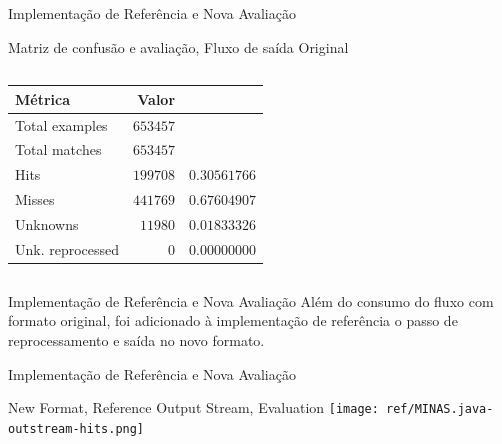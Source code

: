 \documentclass[aspectratio=43,10pt]{beamer}
\begin{document}
\begin{frame}[fragile]{Implementação de Referência e Nova Avaliação}
\begin{alertblock}{Matriz de confusão e avaliação, Fluxo de saída Original}
\begin{columns}[T,onlytextwidth]
      \footnotesize{
      \begin{tabular}
        { l                     | r                 r             }
        \textbf{Métrica}        & \textbf{Valor}  &               \\ \hline
        \hline Total examples   & $653457$        &               \\
        \hline Total matches    & $653457$        &               \\
        \hline Hits             & $199708$        & $0.30561766$  \\
        \hline Misses           & $441769$        & $0.67604907$ \\
        \hline Unknowns         & $11980$         & $0.01833326$ \\
        \hline Unk. reprocessed & $0$             & $0.00000000$ \\

      \end{tabular}
      }

    \end{columns}
  \end{alertblock}
\end{frame}


\begin{frame}[fragile]{Implementação de Referência e Nova Avaliação}
  Além do consumo do fluxo com formato original, foi adicionado à implementação
  de referência o passo de reprocessamento e saída no novo formato.
\end{frame}

\begin{frame}[fragile]{Implementação de Referência e Nova Avaliação}
  \begin{alertblock}{New Format, Reference Output Stream, Evaluation}
    \texttt{[image: ref/MINAS.java-outstream-hits.png]}
  \end{alertblock}
\end{frame}
\end{document}
